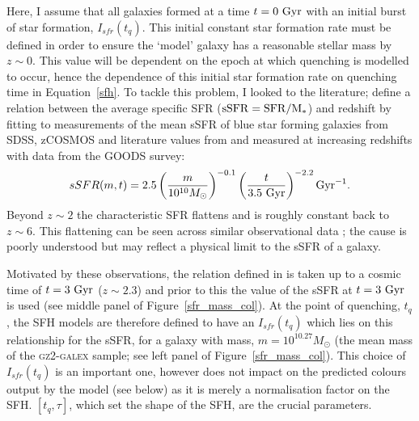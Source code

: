 Here, I assume that all galaxies formed at a time $t=0~\rm{Gyr}$ with an initial burst of star formation, $I_{sfr}(t_q)$. This initial constant star formation rate must be defined in order to ensure the `model' galaxy  has a reasonable stellar mass by $z\sim0$. This value will be dependent on the epoch at which quenching is modelled to occur, hence the dependence of this initial star formation rate on quenching time in Equation~\ref{sfh}. To tackle this problem, I looked to the literature; \citet[][Equation 1]{peng10} define a relation between the average specific SFR ($\rm{sSFR}=SFR/M_*$) and redshift by fitting to measurements of the mean sSFR of blue star forming galaxies from SDSS, zCOSMOS and literature values from \cite{Elbaz07} and \cite{daddi07} measured at increasing redshifts with data from the GOODS survey:
\begin{equation}\label{eq:peng}
sSFR(m,t) = 2.5 \left( \frac{m}{10^{10} M_{\odot}} \right)^{-0.1} \left(\frac{t}{3.5 ~\rm{Gyr}}\right)^{-2.2} \rm{Gyr}^{-1}.
\end{equation}
Beyond $z \sim 2$ the characteristic SFR flattens and is roughly constant back to $z\sim6$. This flattening can be seen across similar observational data \citep{peng10, gonzalez10, bethermin12}; the cause is poorly understood but may reflect a physical limit to the sSFR of a galaxy. 

Motivated by these observations, the relation defined in \citet{peng10} is taken up to a cosmic time of $t=3~\rm{Gyr}$ ($z \sim 2.3$) and prior to this the value of the sSFR at $t=3~\rm{Gyr}$ is used (see middle panel of Figure~\ref{sfr_mass_col}). At the point of quenching, $t_{q}$, the SFH models are therefore defined to have an $I_{sfr}(t_q)$ which lies on this relationship for the sSFR, for a galaxy with mass, $m = 10^{10.27} M_{\odot}$ (the mean mass of the \textsc{gz2-galex} sample; see left panel of Figure~\ref{sfr_mass_col}). This choice of $I_{sfr}(t_q)$ is an important one, however does not impact on the predicted colours output by the model (see below) as it is merely a normalisation factor on the SFH. $[t_q, \tau]$, which set the shape of the SFH, are the crucial parameters. 


